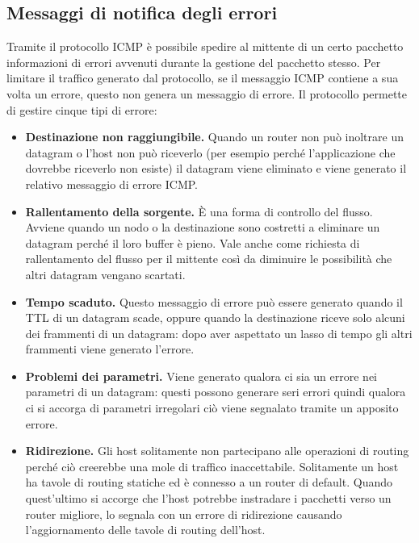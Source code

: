     \subsection{Messaggi di notifica degli errori}
        Tramite il protocollo ICMP è possibile spedire al mittente di un certo pacchetto informazioni di errori avvenuti durante la gestione del pacchetto stesso. Per limitare il traffico generato dal protocollo, se il messaggio ICMP contiene a sua volta un errore, questo non genera un messaggio di errore. Il protocollo permette di gestire cinque tipi di errore:
        \begin{itemize}
            \item \textbf{Destinazione non raggiungibile.} Quando un router non può inoltrare un datagram o l'host non può riceverlo (per esempio perché l'applicazione che dovrebbe riceverlo non esiste) il datagram viene eliminato e viene generato il relativo messaggio di errore ICMP.
            
            \item \textbf{Rallentamento della sorgente.} È una forma di controllo del flusso. Avviene quando un nodo o la destinazione sono costretti a eliminare un datagram perché il loro buffer è pieno. Vale anche come richiesta di rallentamento del flusso per il mittente così da diminuire le possibilità che altri datagram vengano scartati.
            
            \item \textbf{Tempo scaduto.} Questo messaggio di errore può essere generato quando il TTL di un datagram scade, oppure quando la destinazione riceve solo alcuni dei frammenti di un datagram: dopo aver aspettato un lasso di tempo gli altri frammenti viene generato l'errore.
            
            \item \textbf{Problemi dei parametri.} Viene generato qualora ci sia un errore nei parametri di un datagram: questi possono generare seri errori quindi qualora ci si accorga di parametri irregolari ciò viene segnalato tramite un apposito errore.
            
            \item \textbf{Ridirezione.} Gli host solitamente non partecipano alle operazioni di routing perché ciò creerebbe una mole di traffico inaccettabile. Solitamente un host ha tavole di routing statiche ed è connesso a un router di default. Quando quest'ultimo si accorge che l'host potrebbe instradare i pacchetti verso un router migliore, lo segnala con un errore di ridirezione causando l'aggiornamento delle tavole di routing dell'host.
        \end{itemize}
        
